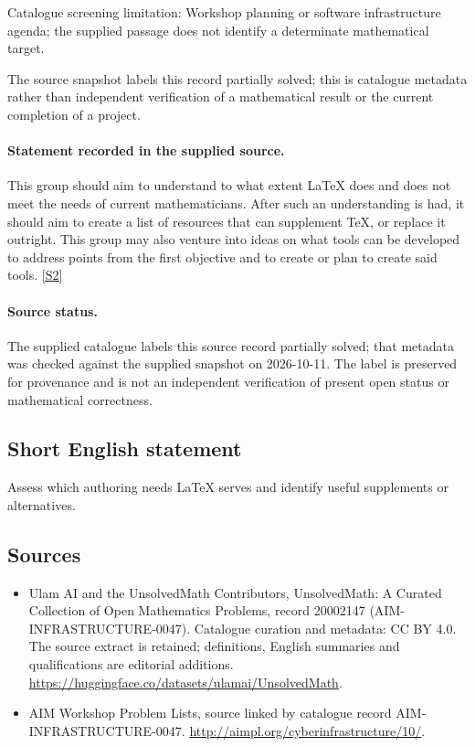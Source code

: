 \documentclass[11pt]{article}
\begin{document}
Catalogue screening limitation: Workshop planning or software infrastructure agenda; the supplied passage does not identify a determinate mathematical target.

The source snapshot labels this record partially solved; this is catalogue metadata rather than independent verification of a mathematical result or the current completion of a project.
\paragraph{Statement recorded in the supplied source.}
This group should aim to understand to what extent LaTeX does and does not meet the needs of current mathematicians. After such an understanding is had, it should aim to create a list of resources that can supplement TeX, or replace it outright. This group may also venture into ideas on what tools can be developed to address points from the first objective and to create or plan to create said tools. \href{http://aimpl.org/cyberinfrastructure/10/}{[S2]}
\paragraph{Source status.}
The supplied catalogue labels this source record partially solved; that metadata was checked against the supplied snapshot on 2026-10-11. The label is preserved for provenance and is not an independent verification of present open status or mathematical correctness.
\subsection{Short English statement}
Assess which authoring needs LaTeX serves and identify useful supplements or alternatives.
\subsection{Sources}
\begin{itemize}
\item[S1] Ulam AI and the UnsolvedMath Contributors, UnsolvedMath: A Curated Collection of Open Mathematics Problems, record 20002147 (AIM-INFRASTRUCTURE-0047). Catalogue curation and metadata: CC BY 4.0. The source extract is retained; definitions, English summaries and qualifications are editorial additions.
\url{https://huggingface.co/datasets/ulamai/UnsolvedMath}.
\item[S2] AIM Workshop Problem Lists, source linked by catalogue record AIM-INFRASTRUCTURE-0047.
\url{http://aimpl.org/cyberinfrastructure/10/}.
\end{itemize}
\end{document}
